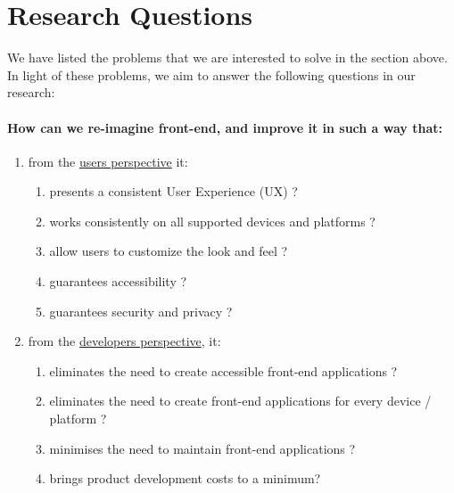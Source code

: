 
\section{Research Questions} \label{researchQuestions}

We have listed the problems that we are interested to solve in the section above. In light of these problems, we aim to answer the following questions in our research:

\paragraph{How can we re-imagine front-end, and improve it in such a way that:}
\begin{enumerate}
  \item from the \underline{users perspective} it:
  \begin{enumerate}
    \item presents a consistent User Experience (UX) ?
    \item works consistently on all supported devices and platforms ?
    \item allow users to customize the look and feel ?
    \item guarantees accessibility ?
    \item guarantees security and privacy ?
  \end{enumerate}
  \item from the \underline{developers perspective}, it:
  \begin{enumerate}
    \item eliminates the need to create accessible front-end applications ?
    \item eliminates the need to create front-end applications for every device / platform ?
    \item minimises the need to maintain front-end applications ?
    \item brings product development costs to a minimum?
    
  \end{enumerate}
\end{enumerate}
